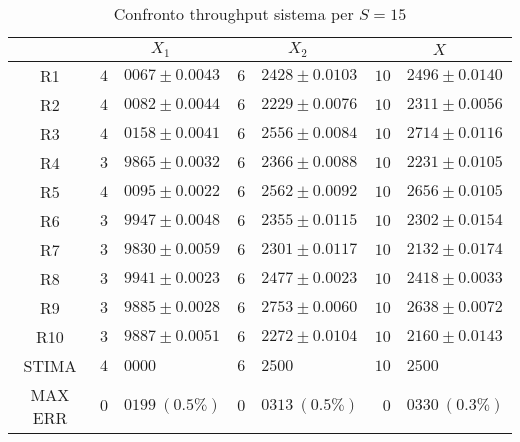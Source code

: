 \begin{table}[!h]
\begin{tabular}{c|r@{.}l|r@{.}l|r@{.}l}
& \multicolumn{2}{|c|}{$X_1$}
& \multicolumn{2}{|c|}{$X_2$}
& \multicolumn{2}{|c}{$X$} 
\\          
\hline
R1      & $4$&$0067 \pm 0.0043$ & $6$&$2428 \pm 0.0103$ & $10$&$2496 \pm 0.0140$ \\
R2      & $4$&$0082 \pm 0.0044$ & $6$&$2229 \pm 0.0076$ & $10$&$2311 \pm 0.0056$ \\
R3      & $4$&$0158 \pm 0.0041$ & $6$&$2556 \pm 0.0084$ & $10$&$2714 \pm 0.0116$ \\
R4      & $3$&$9865 \pm 0.0032$ & $6$&$2366 \pm 0.0088$ & $10$&$2231 \pm 0.0105$ \\
R5      & $4$&$0095 \pm 0.0022$ & $6$&$2562 \pm 0.0092$ & $10$&$2656 \pm 0.0105$ \\
R6      & $3$&$9947 \pm 0.0048$ & $6$&$2355 \pm 0.0115$ & $10$&$2302 \pm 0.0154$ \\
R7      & $3$&$9830 \pm 0.0059$ & $6$&$2301 \pm 0.0117$ & $10$&$2132 \pm 0.0174$ \\
R8      & $3$&$9941 \pm 0.0023$ & $6$&$2477 \pm 0.0023$ & $10$&$2418 \pm 0.0033$ \\
R9      & $3$&$9885 \pm 0.0028$ & $6$&$2753 \pm 0.0060$ & $10$&$2638 \pm 0.0072$ \\
R10     & $3$&$9887 \pm 0.0051$ & $6$&$2272 \pm 0.0104$ & $10$&$2160 \pm 0.0143$ \\
STIMA   & $4$&$0000$            & $6$&$2500$            & $10$&$2500$            \\
MAX ERR & $0$&$0199 \ (0.5\%)$  & $0$&$0313 \ (0.5\%)$  & $0$&$0330 \ (0.3\%)$     
\end{tabular}
\centering
\caption{Confronto throughput sistema per $S=15$}
\label{tab:15_x}
\end{table}
